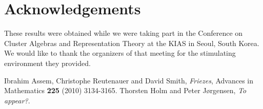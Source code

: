 \documentclass{amsart}
\begin{document}
   \section*{Acknowledgements}
   These results were obtained while we were taking part in the Conference on
Cluster Algebras and Representation Theory at the KIAS in Seoul, South Korea. We would like to thank the organizers of that meeting for the stimulating environment they provided.
    
\begin{thebibliography}{99}
   	Ibrahim Assem, Christophe Reutenauer and David Smith, \emph{Friezes}, Advances in Mathematics {\bf 225} (2010) 3134-3165.
  Thorsten Holm and Peter J\o rgensen, \emph{To appear?}.
\end{thebibliography}
  
\end{document}

